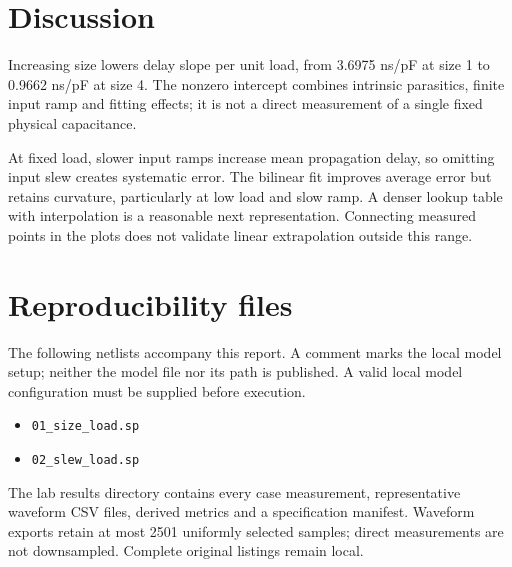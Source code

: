 \section{Discussion}
Increasing size lowers delay slope per unit load, from 3.6975 ns/pF at size 1 to 0.9662 ns/pF at size 4. The nonzero intercept combines intrinsic parasitics, finite input ramp and fitting effects; it is not a direct measurement of a single fixed physical capacitance.

At fixed load, slower input ramps increase mean propagation delay, so omitting input slew creates systematic error. The bilinear fit improves average error but retains curvature, particularly at low load and slow ramp. A denser lookup table with interpolation is a reasonable next representation. Connecting measured points in the plots does not validate linear extrapolation outside this range.

\section{Reproducibility files}
The following netlists accompany this report. A comment marks the local model setup; neither the model file nor its path is published. A valid local model configuration must be supplied before execution.
\begin{itemize}
\item \texttt{01\_size\_load.sp}
\item \texttt{02\_slew\_load.sp}
\end{itemize}
The lab results directory contains every case measurement, representative waveform CSV files, derived metrics and a specification manifest. Waveform exports retain at most 2501 uniformly selected samples; direct measurements are not downsampled. Complete original listings remain local.

